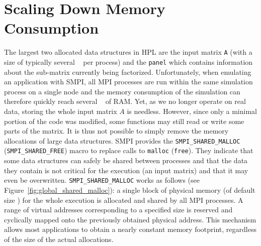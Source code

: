     \section{Scaling Down Memory Consumption}
        The largest two allocated data structures in HPL are the input matrix \texttt{A} (with a size of typically
        several \si{\giga\byte} per process) and the \texttt{panel} which contains information about the sub-matrix
        currently being factorized.
        Unfortunately, when emulating an application with SMPI, all MPI processes are run within the same simulation
        process on a single node and the memory consumption of the simulation can therefore quickly reach several
        \si{\tera\byte} of RAM.  Yet, as we no longer operate on real data, storing the whole input matrix \(A\) is
        needless. However, since only a minimal portion of the code was modified, some functions may still read or write
        some parts of the matrix.  It is thus not possible to simply remove the memory allocations of large data
        structures. SMPI provides the \texttt{SMPI\_SHARED\_MALLOC} (\texttt{SMPI\_SHARED\_FREE}) macro to replace calls
        to \texttt{malloc} (\texttt{free}). They indicate that some data structures can safely be shared between
        processes and that the data they contain is not critical for the execution (\eg an input matrix) and that it may
        even be overwritten. \texttt{SMPI\_SHARED\_MALLOC} works as follows (see
        Figure~\ref{fig:global_shared_malloc}): a single block of physical memory (of default size )
        for the whole execution is allocated and shared by all MPI processes.  A range of virtual addresses
        corresponding to a specified size is reserved and cyclically mapped onto the previously obtained physical
        address.  This mechanism allows most applications to obtain a nearly constant memory footprint, regardless of
        the size of the actual allocations.

